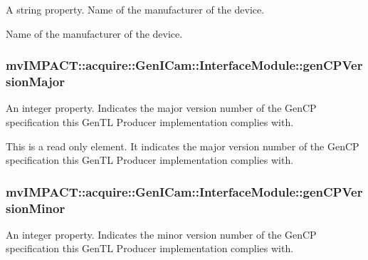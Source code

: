 A string property. Name of the manufacturer of the device. 

Name of the manufacturer of the device. \hypertarget{classmv_i_m_p_a_c_t_1_1acquire_1_1_gen_i_cam_1_1_interface_module_a384d3a7d4dcc0b720b88f1c5ca731766}{
\subsubsection[{gen\+C\+P\+Version\+Major}]{ mv\+I\+M\+P\+A\+C\+T\+::acquire\+::\+Gen\+I\+Cam\+::\+Interface\+Module\+::gen\+C\+P\+Version\+Major}}\label{classmv_i_m_p_a_c_t_1_1acquire_1_1_gen_i_cam_1_1_interface_module_a384d3a7d4dcc0b720b88f1c5ca731766}


An integer property. Indicates the major version number of the Gen\+C\+P specification this Gen\+T\+L Producer implementation complies with. 

This is a read only element. It indicates the major version number of the Gen\+C\+P specification this Gen\+T\+L Producer implementation complies with. \hypertarget{classmv_i_m_p_a_c_t_1_1acquire_1_1_gen_i_cam_1_1_interface_module_a704addfaacfd995b67090cc56b6cc982}{
\subsubsection[{gen\+C\+P\+Version\+Minor}]{ mv\+I\+M\+P\+A\+C\+T\+::acquire\+::\+Gen\+I\+Cam\+::\+Interface\+Module\+::gen\+C\+P\+Version\+Minor}}\label{classmv_i_m_p_a_c_t_1_1acquire_1_1_gen_i_cam_1_1_interface_module_a704addfaacfd995b67090cc56b6cc982}


An integer property. Indicates the minor version number of the Gen\+C\+P specification this Gen\+T\+L Producer implementation complies with. 

